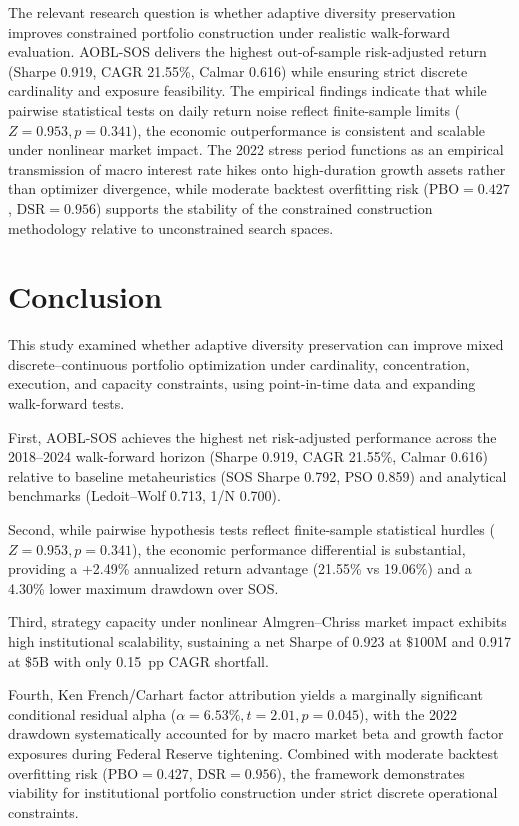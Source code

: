 \documentclass[11pt,a4paper]{article}
\begin{document}
The relevant research question is whether adaptive diversity preservation improves constrained portfolio construction under realistic walk-forward evaluation. AOBL-SOS delivers the highest out-of-sample risk-adjusted return (Sharpe 0.919, CAGR 21.55\%, Calmar 0.616) while ensuring strict discrete cardinality and exposure feasibility. The empirical findings indicate that while pairwise statistical tests on daily return noise reflect finite-sample limits ($Z=0.953, p=0.341$), the economic outperformance is consistent and scalable under nonlinear market impact. The 2022 stress period functions as an empirical transmission of macro interest rate hikes onto high-duration growth assets rather than optimizer divergence, while moderate backtest overfitting risk ($\text{PBO}=0.427$, $\text{DSR}=0.956$) supports the stability of the constrained construction methodology relative to unconstrained search spaces.

\section{Conclusion}
\label{sec:conclusion}

This study examined whether adaptive diversity preservation can improve mixed discrete--continuous portfolio optimization under cardinality, concentration, execution, and capacity constraints, using point-in-time data and expanding walk-forward tests.

First, AOBL-SOS achieves the highest net risk-adjusted performance across the 2018--2024 walk-forward horizon (Sharpe 0.919, CAGR 21.55\%, Calmar 0.616) relative to baseline metaheuristics (SOS Sharpe 0.792, PSO 0.859) and analytical benchmarks (Ledoit--Wolf 0.713, 1/N 0.700).

Second, while pairwise hypothesis tests reflect finite-sample statistical hurdles ($Z=0.953, p=0.341$), the economic performance differential is substantial, providing a +2.49\% annualized return advantage (21.55\% vs 19.06\%) and a 4.30\% lower maximum drawdown over SOS.

Third, strategy capacity under nonlinear Almgren--Chriss market impact exhibits high institutional scalability, sustaining a net Sharpe of 0.923 at $\$100\text{M}$ and 0.917 at $\$5\text{B}$ with only 0.15~pp CAGR shortfall.

Fourth, Ken French/Carhart factor attribution yields a marginally significant conditional residual alpha ($\alpha = 6.53\%, t=2.01, p=0.045$), with the 2022 drawdown systematically accounted for by macro market beta and growth factor exposures during Federal Reserve tightening. Combined with moderate backtest overfitting risk ($\text{PBO} = 0.427$, $\text{DSR} = 0.956$), the framework demonstrates viability for institutional portfolio construction under strict discrete operational constraints.
\end{document}

